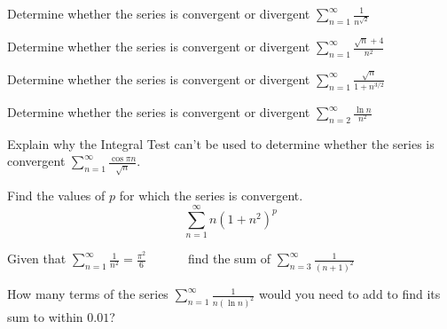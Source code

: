 \documentclass[
  course = {{MATH102 Calculus II}},
  quartile = {{2}},
  assignment = {{Sections 11.3}},%
  topic = {{The Integral Test}},
  firstexercise = 1,
  term = 203
]{../class/aga-homework}
\begin{document}
\newpage

\problem Determine whether the series is convergent or divergent
$\displaystyle \sum_{n=1}^{\infty}\frac{1}{n^{\sqrt{2}}}$

\newpage

\problem Determine whether the series is convergent or divergent
$\displaystyle \sum_{n=1}^{\infty}\frac{\sqrt{n}+4}{n^{2}}$

\newpage

\problem Determine whether the series is convergent or divergent
$\displaystyle \sum_{n=1}^{\infty}\frac{\sqrt{n}}{1+n^{3/2}}$

\newpage

\problem Determine whether the series is convergent or divergent
$\displaystyle \sum_{n=2}^{\infty}\frac{\ln n}{n^{2}}$

\newpage

\problem  Explain why the Integral Test can’t be used to determine whether the series is convergent $\displaystyle \sum_{n=1}^{\infty}\frac{\cos \pi n}{\sqrt{n}}$.

\newpage

\problem Find the values of $p$ for which the series is convergent. \\
$$\displaystyle \sum_{n=1}^{\infty}n(1+n^2)^p$$

\newpage

\problem Given that $\displaystyle \sum_{n=1}^{\infty}\frac{1}{n^2}=\frac{\pi^2}{6}\qquad \quad$
find the sum of
$\displaystyle \sum_{n=3}^{\infty}\frac{1}{(n+1)^2}$

\newpage

\problem How many terms of the series $\displaystyle \sum_{n=1}^{\infty}\frac{1}{n(\ln n)^2}$ would you need to add to find its sum to within $0.01$?
\newpage

\afterpage{\null\newpage}

\afterpage{\null\newpage}

\afterpage{\null\newpage}
\end{document}
